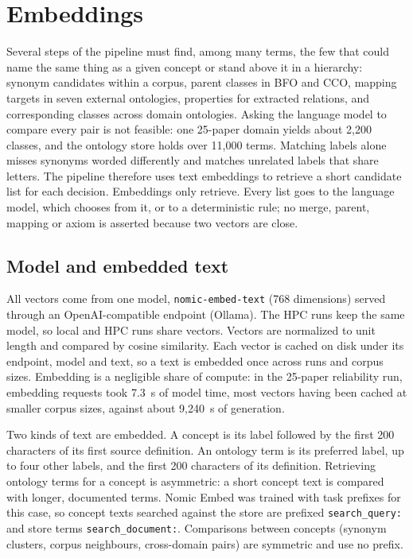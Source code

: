
\section{Embeddings}\label{sec:embeddings}

Several steps of the pipeline must find, among many terms, the few that could name the same thing as a given concept or stand above it in a hierarchy: synonym candidates within a corpus, parent classes in BFO and CCO, mapping targets in seven external ontologies, properties for extracted relations, and corresponding classes across domain ontologies. Asking the language model to compare every pair is not feasible: one 25-paper domain yields about 2,200 classes, and the ontology store holds over 11,000 terms. Matching labels alone misses synonyms worded differently and matches unrelated labels that share letters. The pipeline therefore uses text embeddings to retrieve a short candidate list for each decision. Embeddings only retrieve. Every list goes to the language model, which chooses from it, or to a deterministic rule; no merge, parent, mapping or axiom is asserted because two vectors are close.

\subsection{Model and embedded text}

All vectors come from one model, \texttt{nomic-embed-text} (768 dimensions) %
served through an OpenAI-compatible endpoint (Ollama). The HPC runs keep the same model, so local and HPC runs share vectors. Vectors are normalized to unit length and compared by cosine similarity. Each vector is cached on disk under its endpoint, model and text, so a text is embedded once across runs and corpus sizes. Embedding is a negligible share of compute: in the 25-paper reliability run, embedding requests took 7.3~s of model time, most vectors having been cached at smaller corpus sizes, against about 9,240~s of generation.

Two kinds of text are embedded. A concept is its label followed by the first 200 characters of its first source definition. An ontology term is its preferred label, up to four other labels, and the first 200 characters of its definition. Retrieving ontology terms for a concept is asymmetric: a short concept text is compared with longer, documented terms. Nomic Embed was trained with task prefixes for this case, so concept texts searched against the store are prefixed \texttt{search\_query:} and store terms \texttt{search\_document:}. Comparisons between concepts (synonym clusters, corpus neighbours, cross-domain pairs) are symmetric and use no prefix.


